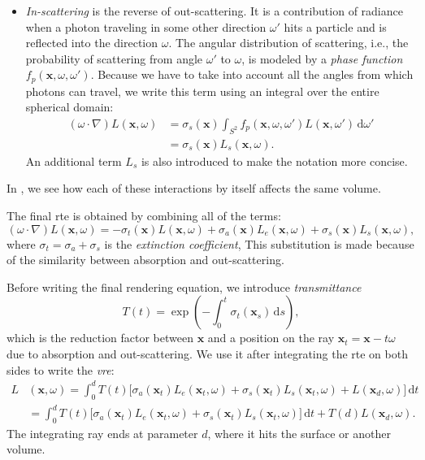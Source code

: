 \begin{itemize}
    \item \emph{In-scattering} is the reverse of out-scattering. It is a
    contribution of radiance when a photon traveling in some other direction
    $\omega'$ hits a particle and is reflected into the direction $\omega$.
    The angular distribution of scattering, i.e., the probability of scattering 
    from angle $\omega'$ to $\omega$, is modeled by a
    \emph{phase function} $f_p(\mathbf{x}, \omega, \omega')$. Because we have
    to take into account all the angles from which photons can travel,
    we write this term using an integral over the entire spherical domain:
    \begin{align}
        (\omega \cdot \nabla) L(\mathbf{x}, \omega) &=
            \sigma_s(\mathbf{x})
            \int_{\mathit{S}^2} f_p(\mathbf{x}, \omega, \omega')
            L(\mathbf{x}, \omega')\, \mathrm{d}\omega' \\
        &= \sigma_s(\mathbf{x}) L_s(\mathbf{x}, \omega).
    \end{align}
    An additional term $L_s$ is also introduced to make the notation more concise.
\end{itemize}
In , we see how each of these interactions by itself
affects the same volume.

The final \ac{rte} is obtained by combining all of the terms:
\begin{equation}
    (\omega \cdot \nabla) L(\mathbf{x}, \omega) =
        -\sigma_t(\mathbf{x}) L(\mathbf{x}, \omega)
        +\sigma_a(\mathbf{x}) L_e(\mathbf{x}, \omega) 
        +\sigma_s(\mathbf{x}) L_s(\mathbf{x}, \omega),
\end{equation}
where $\sigma_t = \sigma_a + \sigma_s$ is the \emph{extinction coefficient},
This substitution is made because of the similarity between absorption and
out-scattering.

Before writing the final rendering equation, we introduce \emph{transmittance}
\begin{equation}
    \label{eq:transmittance}
    T(t) = \exp \left( -\int_0^t \sigma_t(\mathbf{x}_s)\, \mathrm{d}s \right),
\end{equation}
which is the reduction factor between $\mathbf{x}$ and a position on the ray 
$\mathbf{x}_t = \mathbf{x} - t\omega$ due to absorption and out-scattering.
We use it after integrating the \ac{rte} on both sides to write the
\emph{\ac{vre}}:
\begin{align}
    \label{eq:vre}
    L&(\mathbf{x}, \omega) =
        \int_0^d T(t) \bigg[
            \sigma_a(\mathbf{x}_t) L_e(\mathbf{x}_t, \omega)  
            + \sigma_s(\mathbf{x}_t) L_s(\mathbf{x}_t, \omega)
            + L(\mathbf{x}_d, \omega)
        \bigg]\, \mathrm{d}t \\
    &= \int_0^d T(t) \bigg[
            \sigma_a(\mathbf{x}_t) L_e(\mathbf{x}_t, \omega)  
            + \sigma_s(\mathbf{x}_t) L_s(\mathbf{x}_t, \omega)
        \bigg]\, \mathrm{d}t
        + T(d) L(\mathbf{x}_d, \omega).
\end{align}
The integrating ray ends at parameter $d$, where it hits the surface or another
volume.


